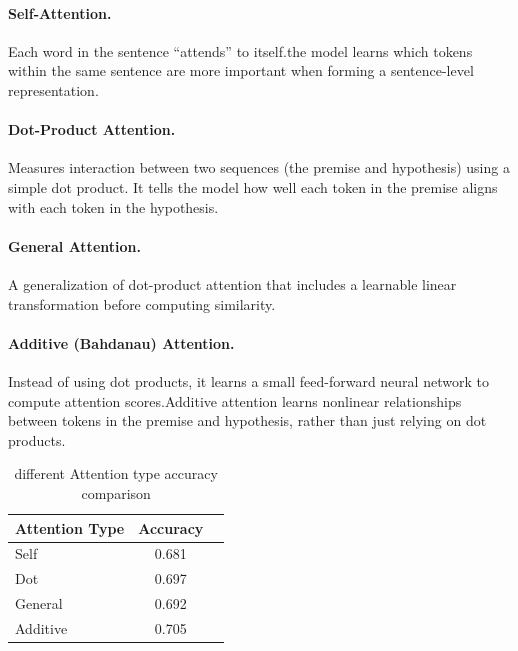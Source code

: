 \documentclass[11pt]{article}
\begin{document}
\paragraph{Self-Attention.}
Each word in the sentence “attends” to itself.the model learns which tokens within the same sentence are more important when forming a sentence-level representation.

\paragraph{Dot-Product Attention.}
Measures interaction between two sequences (the premise and hypothesis) using a simple dot product. It tells the model how well each token in the premise aligns with each token in the hypothesis.
\paragraph{General Attention.}
A generalization of dot-product attention that includes a learnable linear transformation before computing similarity.
\paragraph{Additive (Bahdanau) Attention.}
Instead of using dot products, it learns a small feed-forward neural network to compute attention scores.Additive attention learns nonlinear relationships between tokens in the premise and hypothesis, rather than just relying on dot products.
\begin{table}[H]
  \centering
  \begin{tabular}{lcc}
    \hline
    \textbf{Attention Type} & \textbf{Accuracy}  \\
    \hline
    Self & 0.681  \\
    Dot & 0.697  \\
    General & 0.692  \\
    Additive & 0.705 \\
    \hline
  \end{tabular}
  \caption{different Attention type accuracy comparison}
  \label{tab:dataset_stats}
\end{table}
\end{document}
